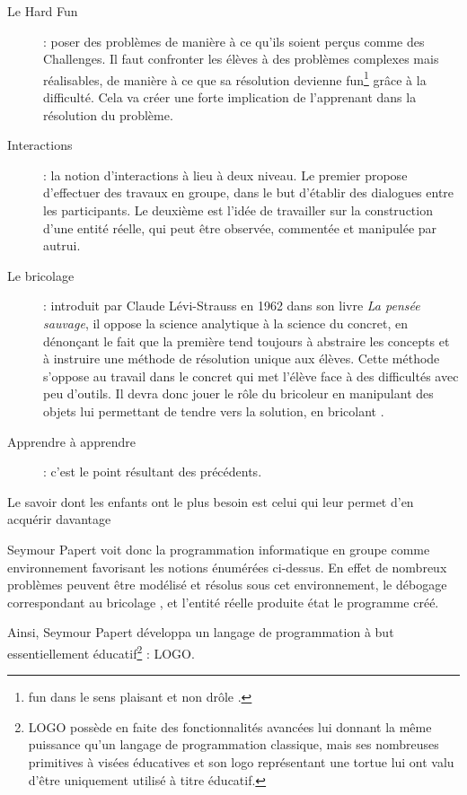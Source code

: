 \begin{description}
  \item[Le \og Hard Fun \fg{}] : poser des problèmes de manière à ce qu'ils soient perçus comme des Challenges. Il faut confronter les élèves à des problèmes complexes mais réalisables, de manière à ce que sa résolution devienne \og{}fun\fg{}\footnote{\og{}fun\fg{} dans le sens \og{}plaisant\fg{} et non \og drôle \fg{}.} grâce à la difficulté. Cela va créer une forte implication de l'apprenant dans la résolution du problème.
  \item[Interactions] : la notion d'interactions à lieu à deux niveau. Le premier propose d'effectuer des travaux en groupe, dans le but d'établir des dialogues entre les participants. Le deuxième est l'idée de travailler sur la construction d'une entité réelle, qui peut être observée, commentée et manipulée par autrui.
  \item[Le \og bricolage \fg{}] : introduit par Claude Lévi-Strauss en 1962 dans son livre \emph{La pensée sauvage}, il oppose la science analytique à la science du concret, en dénonçant le fait que la première tend toujours à abstraire les concepts et à instruire une méthode de résolution unique aux élèves. Cette méthode s'oppose au travail dans le concret qui met l'élève face à des difficultés avec peu d'outils. Il devra donc jouer le rôle du \og bricoleur \fg{} en manipulant des objets lui permettant de tendre vers la solution, en \og bricolant \fg{}.
  \item[\og Apprendre à apprendre \fg{} ] : c'est le point résultant des précédents.
\end{description}

\begin{coolquote}
    Le savoir dont les enfants ont le plus besoin est celui qui leur permet d'en acquérir davantage
\end{coolquote}

Seymour Papert voit donc la programmation informatique en groupe comme environnement favorisant les notions énumérées ci-dessus. En effet de nombreux problèmes peuvent être modélisé et résolus sous cet environnement, le débogage correspondant au \og bricolage \fg{}, et l'entité réelle produite état le programme créé.

Ainsi, Seymour Papert développa un langage de programmation à but
essentiellement éducatif\footnote{LOGO possède en faite des
  fonctionnalités avancées lui donnant la même puissance qu'un langage
  de programmation \og{}classique\fg{}, mais ses nombreuses primitives
  à visées éducatives et son logo représentant une tortue lui ont valu
  d'être uniquement utilisé à titre éducatif.} : LOGO.

